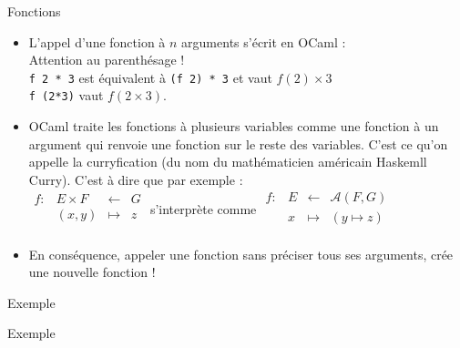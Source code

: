 \documentclass[10pt]{beamer}
\begin{document}
\begin{frame}{\Ctitle}{\stitle}
	\begin{block}{Fonctions}
		\begin{itemize}
			\item <1-> L'appel d'une fonction  à $n$ arguments s'écrit en OCaml :   \\
			      \textcolor{BrickRed}{\danger \;} Attention au parenthésage ! \\
			      {\tt f 2 * 3} est équivalent à {\tt (f 2) * 3} et vaut $f(2) \times 3$ \\
			      {\tt f (2*3)} vaut $f(2\times3)$.
			\item<2-> OCaml traite les fonctions à plusieurs variables comme une fonction à un argument qui renvoie une fonction sur le reste des variables. C'est ce qu'on appelle la \textcolor{BrickRed}{curryfication} (du nom du mathématicien américain Haskemll Curry). C'est à dire que par exemple : \\
				$\begin{array}{llll}
						f : & E \times F & \leftarrow & G \\
						    & (x,y)      & \mapsto    & z \\
					\end{array}$ s'interprète comme
				$\begin{array}{llll}
						f : & E & \leftarrow & \mathcal{A}{(F,G)} \\
						    & x & \mapsto    & (y \mapsto z)      \\
					\end{array}$
			\item<3-> En conséquence, appeler une fonction sans préciser tous ses arguments, crée une nouvelle fonction !
		\end{itemize}
	\end{block}
\end{frame}

\begin{frame}{\Ctitle}{\stitle}
	\begin{exampleblock}{Exemple}
	\end{exampleblock}
\end{frame}

\begin{frame}{\Ctitle}{\stitle}
	\begin{exampleblock}{Exemple}
	\end{exampleblock}
\end{frame}
\end{document}
